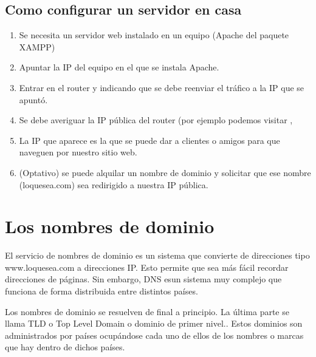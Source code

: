 \documentclass[letterpaper,10pt,spanish]{sphinxmanual}
\begin{document}
\subsection{Como configurar un servidor en casa}
\label{\detokenize{tema1:como-configurar-un-servidor-en-casa}}\begin{enumerate}
\item {} 
Se necesita un servidor web instalado en un equipo (Apache del paquete XAMPP)

\item {} 
Apuntar la IP del equipo en el que se instala Apache.

\item {} 
Entrar en el router y  indicando que se debe reenviar el tráfico a la IP que se apuntó.

\item {} 
Se debe averiguar la IP pública del router (por ejemplo podemos visitar  ,

\item {} 
La IP que aparece es la que se puede dar a clientes o amigos para que naveguen por nuestro sitio web.

\item {} 
(Optativo) se puede alquilar un nombre de dominio y solicitar que ese nombre (loquesea.com) sea redirigido a nuestra IP pública.

\end{enumerate}


\section{Los nombres de dominio}
\label{\detokenize{tema1:los-nombres-de-dominio}}
El servicio de nombres de dominio es un sistema que convierte de direcciones tipo www.loquesea.com a direcciones IP. Esto permite que sea más fácil recordar direcciones de páginas. Sin embargo, DNS esun sistema muy complejo que funciona de forma distribuida entre distintos países.

Los nombres de dominio se resuelven de final a principio. La última parte se llama TLD o Top Level Domain o dominio de primer nivel.. Estos dominios son administrados por países ocupándose cada uno de ellos de los nombres o marcas que hay dentro de dichos países.
\end{document}
